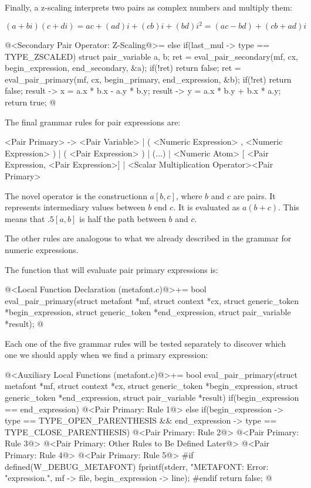 Finally, a z-scaling interprets two pairs as complex numbers and
multiply them:

$$
(a+bi)(c+di) = ac + (ad)i + (cb)i + (bd)i^2 = (ac - bd) + (cb+ad)i
$$

\iniciocodigo
@<Secondary Pair Operator: Z-Scaling@>=
else if(last_mul -> type == TYPE_ZSCALED){
  struct pair_variable a, b;
  ret = eval_pair_secondary(mf, cx, begin_expression, end_secondary, &a);
  if(!ret)
    return false;
  ret = eval_pair_primary(mf, cx, begin_primary, end_expression, &b);
  if(!ret)
    return false;
  result -> x = a.x * b.x - a.y * b.y;
  result -> y = a.x * b.y + b.x * a.y;
  return true;
}
@
\fimcodigo


The final grammar rules for pair expressions are:

\alinhaverbatim
<Pair Primary> -> <Pair Variable> |
                  ( <Numeric Expression> , <Numeric Expression> ) |
                  ( <Pair Expression> ) |
                  (...) |
                  <Numeric Atom> [ <Pair Expression, <Pair Expression>] |
                  <Scalar Multiplication Operator><Pair Primary>
\alinhanormal

The novel operator is the constructionn $a[b, c]$, where $b$ and $c$
are pairs. It represents intermediary values between $b$ end $c$. It
is evaluated as $a(b+c)$. This means that $.5[a,b]$ is half the path
between $b$ and $c$.

The other rules are analogous to what we already described in the
grammar for numeric expressions.

The function that will evaluate pair primary expressions is:

\iniciocodigo
@<Local Function Declaration (metafont.c)@>+=
bool eval_pair_primary(struct metafont *mf, struct context *cx,
                       struct generic_token *begin_expression,
                       struct generic_token *end_expression,
                       struct pair_variable *result);
@
\fimcodigo

Each one of the five grammar rules will be tested separately to
discover which one we should apply when we find a primary expression:

\iniciocodigo
@<Auxiliary Local Functions (metafont.c)@>+=
bool eval_pair_primary(struct metafont *mf, struct context *cx,
                       struct generic_token *begin_expression,
                       struct generic_token *end_expression,
                       struct pair_variable *result){
  if(begin_expression == end_expression){
    @<Pair Primary: Rule 1@>
  }
  else if(begin_expression -> type == TYPE_OPEN_PARENTHESIS &&
          end_expression -> type == TYPE_CLOSE_PARENTHESIS){
    @<Pair Primary: Rule 2@>
    @<Pair Primary: Rule 3@>
  }
  @<Pair Primary: Other Rules to Be Defined Later@>
  @<Pair Primary: Rule 4@>
  @<Pair Primary: Rule 5@>
#if defined(W_DEBUG_METAFONT)
  fprintf(stderr, "METAFONT: Error: %
          "expression.",  mf -> file, begin_expression -> line);
#endif
  return false;
}
@

